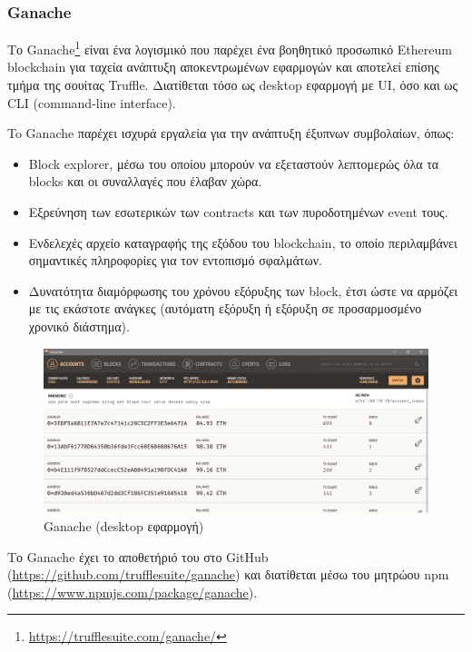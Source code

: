 \subsubsection{Ganache} \label{subsection:4-2-3-2-ganache}


Το Ganache\footnote{\url{https://trufflesuite.com/ganache/}} είναι ένα λογισμικό που παρέχει ένα βοηθητικό προσωπικό Ethereum blockchain για ταχεία ανάπτυξη αποκεντρωμένων εφαρμογών και αποτελεί επίσης τμήμα της σουίτας Truffle. Διατίθεται τόσο ως desktop εφαρμογή με UI, όσο και ως CLI (command-line interface).

To Ganache παρέχει ισχυρά εργαλεία για την ανάπτυξη έξυπνων συμβολαίων, όπως:
\begin{itemize}
	\item Block explorer, μέσω του οποίου μπορούν να εξεταστούν λεπτομερώς όλα τα blocks και οι συναλλαγές που έλαβαν χώρα.
	\item Εξρεύνηση των εσωτερικών των contracts και των πυροδοτημένων event τους.
	\item Ενδελεχές αρχείο καταγραφής της εξόδου του blockchain, το οποίο περιλαμβάνει σημαντικές πληροφορίες για τον εντοπισμό σφαλμάτων.
	\item Δυνατότητα διαμόρφωσης του χρόνου εξόρυξης των block, έτσι ώστε να αρμόζει με τις εκάστοτε ανάγκες (αυτόματη εξόρυξη ή εξόρυξη σε προσαρμοσμένο χρονικό διάστημα).
\end{itemize}

\begin{figure}[H]
	\centering
	\includegraphics[width=.95\textwidth]{assets/figures/chapter-4/4.2.ganache-gui}
	\caption{Ganache (desktop εφαρμογή)}
\end{figure}

Το Ganache έχει το αποθετήριό του στο GitHub (\url{https://github.com/trufflesuite/ganache}) και διατίθεται μέσω του μητρώου npm (\url{https://www.npmjs.com/package/ganache}).